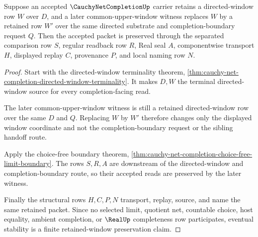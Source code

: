 \begin{theorem}
\label{thm:cauchy-net-completion-root-eventual-stability}
Suppose an accepted $\CauchyNetCompletionUp$ carrier retains a directed-window row $W$ over $D$, and a later common-upper-window witness replaces $W$ by a retained row $W'$ over the same directed substrate and completion-boundary request $Q$. Then the accepted packet is preserved through the separated comparison row $S$, regular readback row $R$, Real seal $A$, componentwise transport $H$, displayed replay $C$, provenance $P$, and local naming row $N$.
\end{theorem}
\begin{proof}
Start with the directed-window terminality theorem, \autoref{thm:cauchy-net-completion-directed-window-terminality}. It makes $D,W$ the terminal directed-window source for every completion-facing read.

The later common-upper-window witness is still a retained directed-window row over the same $D$ and $Q$. Replacing $W$ by $W'$ therefore changes only the displayed window coordinate and not the completion-boundary request or the sibling handoff route.

Apply the choice-free boundary theorem, \autoref{thm:cauchy-net-completion-choice-free-limit-boundary}. The rows $S,R,A$ are downstream of the directed-window and completion-boundary route, so their accepted reads are preserved by the later witness.

Finally the structural rows $H,C,P,N$ transport, replay, source, and name the same retained packet. Since no selected limit, quotient net, countable choice, host equality, ambient completion, or $\RealUp$ completeness row participates, eventual stability is a finite retained-window preservation claim.
\end{proof}

